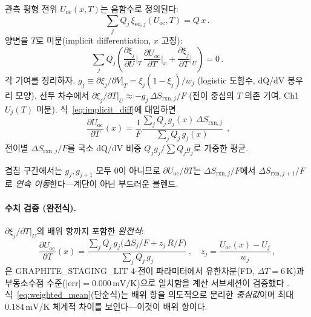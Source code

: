 \documentclass[11pt,a4paper]{article}
\newcommand{\rxn}{\mathrm{rxn}}
\newcommand{\eq}{\mathrm{eq}}
\newcommand{\oc}{\mathrm{oc}}
\begin{document}
관측 평형 전위 $U_{\oc}(x,T)$는 음함수로 정의된다:
\begin{equation}
  \sum_j Q_j\,\xi_{\eq,j}(U_{\oc},T)=Q\,x\,.
  \label{eq:implicit}
\end{equation}
양변을 $T$로 미분(implicit differentiation, $x$ 고정):
\begin{equation}
  \sum_j Q_j\left(\frac{\partial\xi_j}{\partial U}\bigg|_T\,
    \frac{\partial U_{\oc}}{\partial T}\bigg|_x
    +\frac{\partial\xi_j}{\partial T}\bigg|_U\right)=0\,.
  \label{eq:implicit_diff}
\end{equation}
각 기여를 정리하자.
$g_j\equiv\partial\xi_j/\partial V|_T=\xi_j(1-\xi_j)/w_j$ (logistic 도함수, dQ/dV 봉우리 모양).
선두 차수에서 $\partial\xi_j/\partial T|_U\approx-g_j\,\Delta S_{\rxn,j}/F$
(전이 중심의 $T$ 의존 기여, Ch1 $U_j(T)$ 미분). 식~\eqref{eq:implicit_diff}에 대입하면
\begin{equation}
  \boxed{\;\frac{\partial U_{\oc}}{\partial T}(x)
    =\frac{1}{F}\frac{\sum_j Q_j\,g_j(x)\,\Delta S_{\rxn,j}}{\sum_j Q_j\,g_j(x)}\;}\,,
  \label{eq:weighted_mean}
\end{equation}
전이별 $\Delta S_{\rxn,j}/F$를 국소 dQ/dV 비중 $Q_jg_j/\sum Q_jg_j$로 가중한 평균.

겹침 구간에서는 $g_j,g_{j+1}$ 모두 0이 아니므로
$\partial U_{\oc}/\partial T$는 $\Delta S_{\rxn,j}/F$에서 $\Delta S_{\rxn,j+1}/F$로
\emph{연속 이동}한다---계단이 아닌 부드러운 블렌드.

\paragraph{수치 검증 (완전식).}
$\partial\xi_j/\partial T|_U$의 배위 항까지 포함한 \emph{완전식}:
\begin{equation}
  \frac{\partial U_{\oc}}{\partial T}(x)
    =\frac{\sum_j Q_j\,g_j\bigl(\Delta S_j/F+z_j\,R/F\bigr)}{\sum_j Q_j\,g_j}\,,
    \quad z_j=\frac{U_{\oc}(x)-U_j}{w_j}\,,
  \label{eq:full_deriv}
\end{equation}
은 GRAPHITE\_STAGING\_LIT 4-전이 파라미터에서 유한차분(FD, $\Delta T=6$\,K)과
부동소수점 수준($|\mathrm{err}|=0.000\,\mathrm{mV/K}$)으로 일치함을 계산 서브세션이 검증했다
\cite{numericalverif2026}.
식~\eqref{eq:weighted_mean}(단순식)는 배위 항을 의도적으로 분리한 \emph{중심값}이며
최대 $0.184\,\mathrm{mV/K}$ 체계적 차이를 보인다---이것이 배위 항이다.
\end{document}
